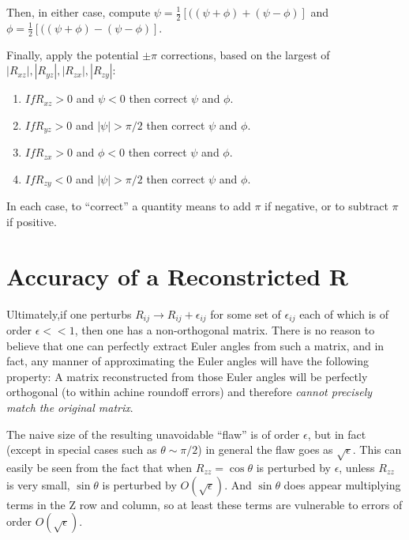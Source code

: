 \documentclass[twoside,12pt]{article}
\begin{document}
\noindent
Then, in either case, compute
$\psi = \frac{1}{2} \left[ ( (\psi + \phi) + (\psi - \phi) \right]$ and
$\phi = \frac{1}{2} \left[ ( (\psi + \phi) - (\psi - \phi) \right]$.

\noindent
Finally, apply the potential $\pm \pi$ corrections, based on the largest of 
$|R_{xz}|,|R_{yz}|,|R_{zx}|,|R_{zy}|$: 
\begin{enumerate}
\item
$If R_{xz} > 0$ and $\psi < 0$ then correct $\psi$ and $\phi$.
\item
$If R_{yz} > 0$ and $|\psi| > \pi/2$ then correct $\psi$ and $\phi$.
\item
$If R_{zx} > 0$ and $\phi < 0$ then correct $\psi$ and $\phi$.
\item
$If R_{zy} < 0$ and $|\psi| > \pi/2$ then correct $\psi$ and $\phi$.
\end{enumerate}
\noindent
In each case, to ``correct'' a quantity means to add $\pi$ if negative, or to
subtract $\pi$ if positive.

\section{Accuracy of a Reconstricted R}

Ultimately,if one perturbs 
$R_{ij} \rightarrow R_{ij}+\epsilon_{ij}$ for some set of  
$\epsilon_{ij}$ each of which is of order $\epsilon << 1$,
then one has a non-orthogonal matrix.
There is no reason to believe that one can perfectly extract Euler angles
from such a matrix, and in fact, any manner of approximating the Euler angles
will have the following property:
A matrix reconstructed from those Euler angles will be perfectly orthogonal
(to within achine roundoff errors) and therefore {\em cannot precisely 
match the original matrix}.

The naive size of the resulting unavoidable ``flaw'' is of order 
$\epsilon$, but in fact (except in special cases such as $\theta \sim \pi/2$)
in general the flaw goes as $\sqrt{\epsilon}$.  This can easily be seen
from the fact that when $R_{zz} = \cos \theta $ 
is perturbed by $\epsilon$, unless
$R_{zz}$ is very small, $\sin \theta$ is perturbed by $O(\sqrt{\epsilon})$.
And $\sin \theta$  does appear multiplying terms in the Z row and column, 
so at least these terms are vulnerable to errors of order $O(\sqrt{\epsilon})$.
 
\end{document}
